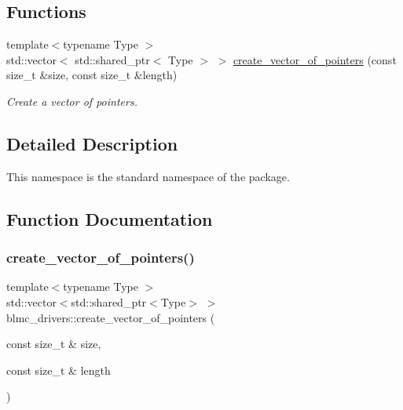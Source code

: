 \subsection*{Functions}
\begin{DoxyCompactItemize}
\item 
{\footnotesize template$<$typename Type $>$ }\\std\+::vector$<$ std\+::shared\+\_\+ptr$<$ Type $>$ $>$ \hyperlink{namespaceblmc__drivers_add73ea2a43509013ad00665753f175e1}{create\+\_\+vector\+\_\+of\+\_\+pointers} (const size\+\_\+t \&size, const size\+\_\+t \&length)
\begin{DoxyCompactList}\small\item\em Create a vector of pointers. \end{DoxyCompactList}\end{DoxyCompactItemize}


\subsection{Detailed Description}
This namespace is the standard namespace of the package. 

\subsection{Function Documentation}
\mbox{\label{namespaceblmc__drivers_add73ea2a43509013ad00665753f175e1}} 
\subsubsection{\texorpdfstring{create\+\_\+vector\+\_\+of\+\_\+pointers()}{create\_vector\_of\_pointers()}}
{\footnotesize\ttfamily template$<$typename Type $>$ \\
std\+::vector$<$std\+::shared\+\_\+ptr$<$Type$>$ $>$ blmc\+\_\+drivers\+::create\+\_\+vector\+\_\+of\+\_\+pointers (\begin{DoxyParamCaption}\item[{const size\+\_\+t \&}]{size,  }\item[{const size\+\_\+t \&}]{length }\end{DoxyParamCaption})}



